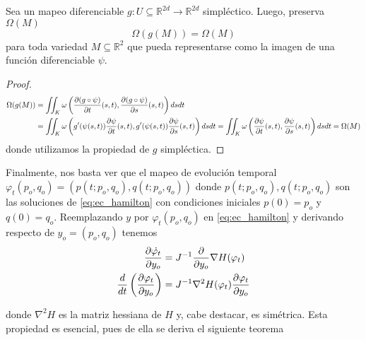 \begin{theorem}{\label{teo:preservacion_vol}}
 Sea un mapeo diferenciable $g:U\subseteq\mathbb{R}^{2d}\to\mathbb{R}^{2d}$ simpléctico. Luego, preserva $\Omega(M)$
 \[ \Omega(g(M)) = \Omega(M) \]
 para toda variedad $M\subseteq\mathbb{R}^2$ que pueda representarse como la imagen de una función diferenciable $\psi$.
\end{theorem}
\begin{proof}
\begin{align*}
 \Omega(g(M)) &=  \iint_K \omega\left(\frac{\partial(g\circ\psi)}{\partial t}(s,t), \frac{\partial(g\circ\psi)}{\partial s}(s,t)\right) ds dt \\
&= \iint_K \omega\left(g'(\psi(s,t))\frac{\partial\psi}{\partial t}(s,t), g'(\psi(s,t))\frac{\partial\psi}{\partial s}(s,t)\right) ds dt = \iint_K \omega\left(\frac{\partial\psi}{\partial t}(s,t), \frac{\partial\psi}{\partial s}(s,t)\right) ds dt = \Omega(M)
\end{align*}
donde utilizamos la propiedad de $g$ simpléctica.
\end{proof}

Finalmente, nos basta ver que el mapeo de evolución temporal $\varphi_t(p_o,q_o) = (p(t;p_o,q_o), q(t;p_o,q_o))$ donde $p(t;p_o,q_o), q(t;p_o,q_o)$ son las soluciones de \eqref{eq:ec_hamilton}
con condiciones iniciales $p(0)=p_o$ y $q(0)=q_o$.
Reemplazando $y$ por $\varphi_t(p_o,q_o)$ en \eqref{eq:ec_hamilton} y derivando respecto de $y_o=(p_o,q_o)$ tenemos
\begin{align*}
 \frac{\partial\dot{\varphi_t}}{\partial y_o} &= J^{-1}\frac{\partial}{\partial y_o} \nabla H(\varphi_t) \\
 \frac{d}{dt}\left(\frac{\partial\varphi_t}{\partial y_o}\right) &= J^{-1} \nabla^2 H(\varphi_t)\frac{\partial\varphi_t}{\partial y_o}
\end{align*}

donde $\nabla^2 H$ es la matriz hessiana de $H$ y, cabe destacar, es simétrica. Esta propiedad es esencial, pues de ella se deriva el siguiente teorema

